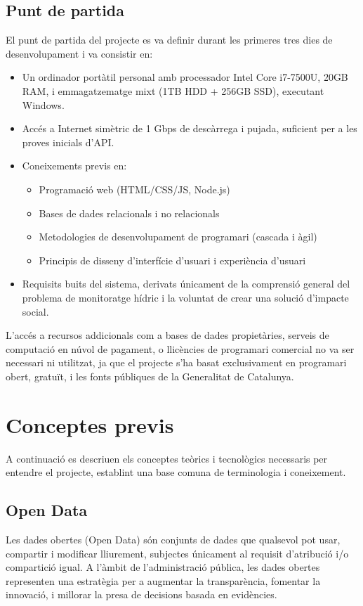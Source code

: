 \subsection{Punt de partida}
El punt de partida del projecte es va definir durant les primeres tres dies de desenvolupament i va consistir en:
\begin{itemize}
    \item Un ordinador portàtil personal amb processador Intel Core i7-7500U, 20GB RAM, i emmagatzematge mixt (1TB HDD + 256GB SSD), executant Windows.
    \item Accés a Internet simètric de 1 Gbps de descàrrega i pujada, suficient per a les proves inicials d'API.
    \item Coneixements previs en:
          \begin{itemize}
              \item Programació web (HTML/CSS/JS, Node.js)
               \item Bases de dades relacionals i no relacionals
              \item Metodologies de desenvolupament de programari (cascada i àgil)
              \item Principis de disseny d'interfície d'usuari i experiència d'usuari
          \end{itemize}
    \item Requisits buits del sistema, derivats únicament de la comprensió general del problema de monitoratge hídric i la voluntat de crear una solució d'impacte social.
\end{itemize}

L'accés a recursos addicionals com a bases de dades propietàries, serveis de computació en núvol de pagament, o llicències de programari comercial no va ser necessari ni utilitzat, ja que el projecte s'ha basat exclusivament en programari obert, gratuït, i les fonts públiques de la Generalitat de Catalunya.

\section{Conceptes previs}

A continuació es descriuen els conceptes teòrics i tecnològics necessaris per entendre
el projecte, establint una base comuna de terminologia i coneixement.

\subsection{Open Data}
Les dades obertes (Open Data) són conjunts de dades que qualsevol pot usar, compartir i modificar lliurement, subjectes únicament al requisit d'atribució i/o compartició igual. A l'àmbit de l'administració pública, les dades obertes representen una estratègia per a augmentar la transparència, fomentar la innovació, i millorar la presa de decisions basada en evidències.

